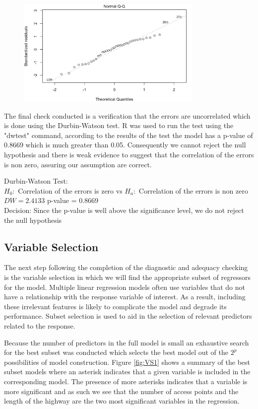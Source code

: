 \documentclass[12pt]{report}
\begin{document}
\begin{figure}[H]
    \centering
    \includegraphics[width=0.8\textwidth]{Adequacy tests/QQ plot.png}
\end{figure}
\noindent

The final check conducted is a verification that the errors are uncorrelated which is done using the Durbin-Watson test. R was used to run the test using the "dwtest" command, according to the results of the test the model has a p-value of 0.8669 which is much greater than 0.05. Consequently we cannot reject the null hypothesis and there is weak evidence to suggest that the correlation of the errors is non zero, assuring our assumption are correct.

Durbin-Watson Test:
\\$H_{0}:$ Correlation of the errors is zero vs $H_{a}:$ Correlation of the errors is non zero
\\$DW = 2.4133$ \quad p-value = 0.8669
\\Decision: Since the p-value is well above the significance level, we do not reject the null hypothesis

\subsection{Variable Selection}
The next step following the completion of the diagnostic and adequacy checking is the variable selection in which we will find the appropriate subset of regressors for the model. Multiple linear regression models often use variables that do not have a relationship with the response variable of interest. As a result, including these irrelevant features is likely to complicate the model and degrade its performance. Subset selection is used to aid in the selection of relevant predictors related to the response.

Because the number of predictors in the full model is small an exhaustive search for the best subset was conducted which selects the best model out of the $2^p$ possibilities of model construction. Figure \ref{fig:VS1} shows a summary of the best subset models where an asterisk indicates that a given variable is included in the corresponding model. The presence of more asterisks indicates that a variable is more significant and as such we see that the number of access points and the length of the highway are the two most significant variables in the regression.
\end{document}
